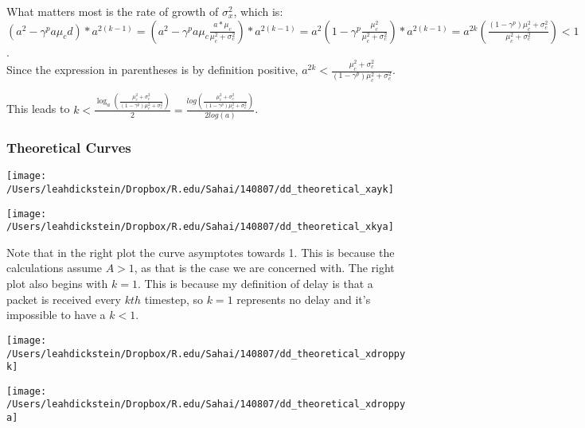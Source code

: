 \documentclass[leqno,twocolumn]{article}
\begin{document}
What matters most is the rate of growth of $\sigma_x^2$, which is:\\
$(a^2 -\gamma^p a\mu_c d) * a^{2(k-1)} = (a^2 -\gamma^p a\mu_c \frac{a*\mu_c}{\mu_c^2+\sigma_c^2}) * a^{2(k-1)} = a^2\left(1 -\gamma^p \frac{\mu_c^2}{\mu_c^2+\sigma_c^2}\right) * a^{2(k-1)} = a^{2k} \left(\frac{(1-\gamma^p)\mu_c^2 +\sigma_c^2}{\mu_c^2+\sigma_c^2}\right) < 1$.\\

Since the expression in parentheses is by definition positive, $\boxed{a^{2k} < \frac{\mu_c^2+\sigma_c^2}{(1-\gamma^p)\mu_c^2+\sigma_c^2}}$.

\begin{center}This leads to $\boxed{k < \frac{\log_a\left(\frac{\mu_c^2+\sigma_c^2}{(1-\gamma^p)\mu_c^2+\sigma_c^2}\right)}{2} = \frac{log\left(\frac{\mu_c^2+\sigma_c^2}{(1-\gamma^p)\mu_c^2+\sigma_c^2}\right)}{2log(a)}}$.\end{center}

\subsubsection{Theoretical Curves}

\begin{minipage}[c]{0.5\textwidth}
\texttt{[image: /Users/leahdickstein/Dropbox/R.edu/Sahai/140807/dd\_theoretical\_xayk]}
\end{minipage}
\begin{minipage}[c]{0.5\textwidth}
\texttt{[image: /Users/leahdickstein/Dropbox/R.edu/Sahai/140807/dd\_theoretical\_xkya]}
\end{minipage}

Note that in the right plot the curve asymptotes towards 1. This is because the calculations assume $A > 1$, as that is the case we are concerned with. The right plot also begins with $k = 1$. This is because my definition of delay is that a packet is received every $k{th}$ timestep, so $k=1$ represents no delay and it's impossible to have a $k < 1$.

\begin{minipage}[c]{0.5\textwidth}
\texttt{[image: /Users/leahdickstein/Dropbox/R.edu/Sahai/140807/dd\_theoretical\_xdroppyk]}
\end{minipage}
\begin{minipage}[c]{0.5\textwidth}
\texttt{[image: /Users/leahdickstein/Dropbox/R.edu/Sahai/140807/dd\_theoretical\_xdroppya]}
\end{minipage}
\end{document}

